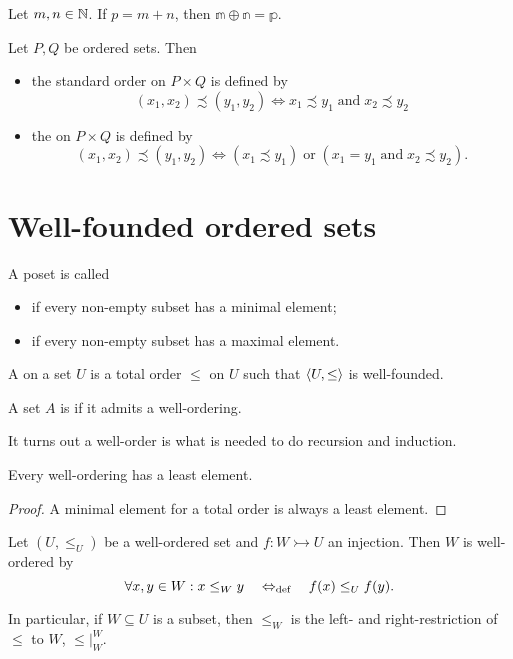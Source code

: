 \begin{lemma}
Let $m,n\in \mathbb{N}$. If $p = m+n$, then $\mathbb{m}\oplus\mathbb{n} = \mathbb{p}$.
\end{lemma}

\begin{definition}
Let $P,Q$ be ordered sets. Then
\begin{itemize}
\item  the standard order on $P\times Q$ is defined by
\[ (x_1,x_2) \precsim (y_1,y_2) \iff x_1\precsim y_1 \;\text{and}\; x_2\precsim y_2 \]
\item the  on $P\times Q$ is defined by
\[ (x_1,x_2) \precsim (y_1,y_2) \iff (x_1\precsim y_1) \;\text{or}\; (x_1=y_1 \;\text{and}\; x_2\precsim y_2). \]
\end{itemize}
\end{definition}


\section{Well-founded ordered sets}
\begin{definition}
A poset is called
\begin{itemize}
\item {} if every non-empty subset has a minimal element;
\item {} if every non-empty subset has a maximal element.
\end{itemize}

A  on a set $U$ is a total order $\leq$ on $U$ such that $\langle U,\leq \rangle$ is well-founded.

A set $A$ is  if it admits a well-ordering.
\end{definition}
It turns out a well-order is what is needed to do recursion and induction.

\begin{lemma}
Every well-ordering has a least element.
\end{lemma}
\begin{proof}
A minimal element for a total order is always a least element.
\end{proof}

\begin{lemma} \label{lemma:wellOrderingSubsets}
Let $(U,\leq_U)$ be a well-ordered set and $f: W \rightarrowtail U$ an injection. Then $W$ is well-ordered by
\[ \forall x,y\in W: x\leq_W y \quad\Leftrightarrow_{\text{def}}\quad f(x) \leq_U f(y). \]


In particular, if $W\subseteq U$ is a subset, then $\leq_W$ is the left- and right-restriction of $\leq$ to $W$, $\leq|_W^W$.
\end{lemma}

